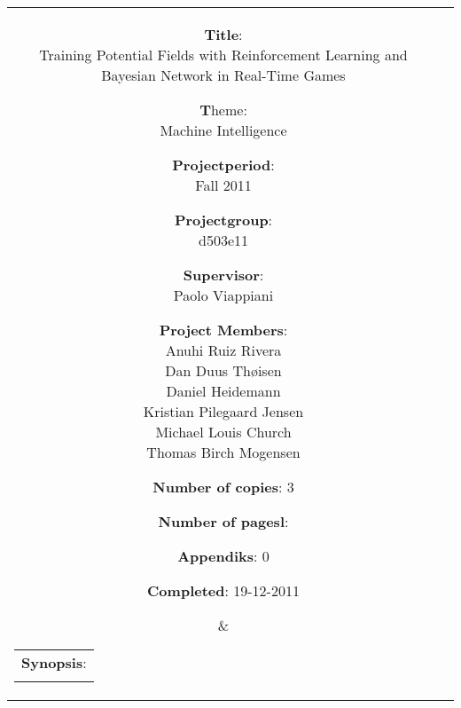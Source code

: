 	\begin{tabular}{cc}
		\parbox[0.1cm]{7cm}{ %
			\begin{description}
				\item {\textbf{Title}:} \\
					Training Potential Fields with Reinforcement Learning and Bayesian Network in Real-Time Games
				\item {\textbf Theme:} \\
					Machine Intelligence
 			\end{description}

			\parbox{8cm}{ %
				\begin{description}
					\item {\textbf{Projectperiod}:}\\
					Fall 2011\\
					\hspace{4cm}
					\item {\textbf{Projectgroup}:}\\
					d503e11\\
					\hspace{4cm}
					\item {\textbf{Supervisor}:}\\
					Paolo Viappiani \\
					\item {\textbf{Project Members}:}\\ \newcommand{\sh}{18pt} %
					Anuhi Ruiz Rivera \\
					Dan Duus Thøisen \\
					Daniel Heidemann \\
					Kristian Pilegaard Jensen \\
					Michael Louis Church \\
					Thomas Birch Mogensen \\
				\end{description}
			}
			\begin{description}
				\item {\textbf{Number of copies}:} 3
				\item {\textbf{Number of pagesl}:} \pageref{LastPage}
				\item {\textbf{Appendiks}:} 0
				\item {\textbf{Completed}:} 19-12-2011
			\end{description}
			\vfill 
		} &
		\parbox{7cm}{ %
			\hfill %
			\begin{tabular}{l}%
				{\textbf{Synopsis}:}\bigskip \\%
				\fbox{ %
					\parbox{6.5cm}{\bigskip %
					{\vfill{\small %
					 
						\bigskip}}%
					}}%
			\end{tabular}%
		}
	\end{tabular}
	\\ \\

